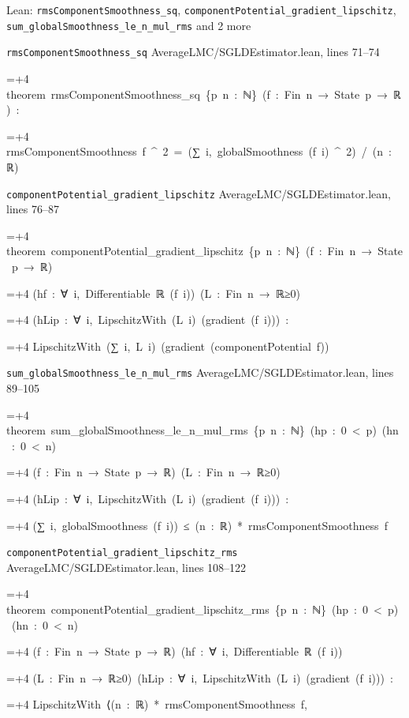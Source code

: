 \documentclass[11pt,a4paper]{report}
\newlength{\leancharwidth}
\newenvironment{leancode}{\par\smallskip\begingroup\ttfamily\footnotesize\raggedright
  \settowidth{\leancharwidth}{M}\setlength{\parskip}{0pt}\setlength{\parindent}{0pt}
  \frenchspacing}{\par\endgroup\smallskip}
\newcommand{\leanline}[2]{\hangindent=\dimexpr#1\leancharwidth+4\leancharwidth\relax
  \hangafter=1\noindent\hspace*{#1\leancharwidth}#2\par}
\newcommand{\leansource}[1]{\par{\footnotesize\color{leanmuted}#1}\par}
\begin{document}
\begin{leanbox}{Lean: \texttt{rmsComponentSmoothness\_\allowbreak{}sq}, \texttt{componentPotential\_\allowbreak{}gradient\_\allowbreak{}lipschitz}, \texttt{sum\_\allowbreak{}globalSmoothness\_\allowbreak{}le\_\allowbreak{}n\_\allowbreak{}mul\_\allowbreak{}rms} and 2 more}
\leansource{\texttt{rmsComponentSmoothness\_\allowbreak{}sq} \quad AverageLMC/\allowbreak{}SGLDEstimator.lean, lines 71–74}
\begin{leancode}
\leanline{0}{theorem\ rmsComponentSmoothness\_sq\ \{p\ n\ :\ ℕ\}\ (f\ :\ Fin\ n\ →\ State\ p\ →\ ℝ)\ :}
\leanline{4}{rmsComponentSmoothness\ f\ \textasciicircum{}\ 2\ =\ (∑\ i,\ globalSmoothness\ (f\ i)\ \textasciicircum{}\ 2)\ /\ (n\ :\ ℝ)}
\end{leancode}
\leansource{\texttt{componentPotential\_\allowbreak{}gradient\_\allowbreak{}lipschitz} \quad AverageLMC/\allowbreak{}SGLDEstimator.lean, lines 76–87}
\begin{leancode}
\leanline{0}{theorem\ componentPotential\_gradient\_lipschitz\ \{p\ n\ :\ ℕ\}\ (f\ :\ Fin\ n\ →\ State\ p\ →\ ℝ)}
\leanline{4}{(hf\ :\ ∀\ i,\ Differentiable\ ℝ\ (f\ i))\ (L\ :\ Fin\ n\ →\ ℝ≥0)}
\leanline{4}{(hLip\ :\ ∀\ i,\ LipschitzWith\ (L\ i)\ (gradient\ (f\ i)))\ :}
\leanline{4}{LipschitzWith\ (∑\ i,\ L\ i)\ (gradient\ (componentPotential\ f))}
\end{leancode}
\leansource{\texttt{sum\_\allowbreak{}globalSmoothness\_\allowbreak{}le\_\allowbreak{}n\_\allowbreak{}mul\_\allowbreak{}rms} \quad AverageLMC/\allowbreak{}SGLDEstimator.lean, lines 89–105}
\begin{leancode}
\leanline{0}{theorem\ sum\_globalSmoothness\_le\_n\_mul\_rms\ \{p\ n\ :\ ℕ\}\ (hp\ :\ 0\ <\ p)\ (hn\ :\ 0\ <\ n)}
\leanline{4}{(f\ :\ Fin\ n\ →\ State\ p\ →\ ℝ)\ (L\ :\ Fin\ n\ →\ ℝ≥0)}
\leanline{4}{(hLip\ :\ ∀\ i,\ LipschitzWith\ (L\ i)\ (gradient\ (f\ i)))\ :}
\leanline{4}{(∑\ i,\ globalSmoothness\ (f\ i))\ ≤\ (n\ :\ ℝ)\ *\ rmsComponentSmoothness\ f}
\end{leancode}
\leansource{\texttt{componentPotential\_\allowbreak{}gradient\_\allowbreak{}lipschitz\_\allowbreak{}rms} \quad AverageLMC/\allowbreak{}SGLDEstimator.lean, lines 108–122}
\begin{leancode}
\leanline{0}{theorem\ componentPotential\_gradient\_lipschitz\_rms\ \{p\ n\ :\ ℕ\}\ (hp\ :\ 0\ <\ p)\ (hn\ :\ 0\ <\ n)}
\leanline{4}{(f\ :\ Fin\ n\ →\ State\ p\ →\ ℝ)\ (hf\ :\ ∀\ i,\ Differentiable\ ℝ\ (f\ i))}
\leanline{4}{(L\ :\ Fin\ n\ →\ ℝ≥0)\ (hLip\ :\ ∀\ i,\ LipschitzWith\ (L\ i)\ (gradient\ (f\ i)))\ :}
\leanline{4}{LipschitzWith\ ⟨(n\ :\ ℝ)\ *\ rmsComponentSmoothness\ f,}

\end{leancode}
\end{leanbox}
\end{document}
